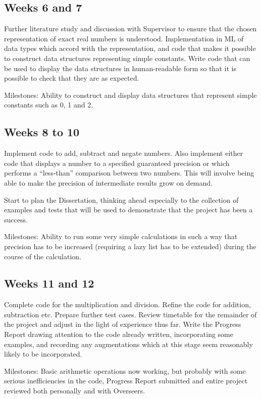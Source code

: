 \documentclass[12pt]{article}
\begin{document}
\subsection*{Weeks 6 and 7}

Further literature study and discussion with Supervisor to ensure that
the chosen representation of exact real numbers is understood.
Implementation in ML of data types which accord with the
representation, and code that makes it possible to construct data
structures representing simple constants.  Write code that can be used
to display the data structures in human-readable form so that it is
possible to check that they are as expected.

Milestones: Ability to construct and display data structures that
represent simple constants such as 0, 1 and 2.


\subsection*{Weeks 8 to 10}

Implement code to add, subtract and negate numbers.  Also implement
either code that displays a number to a specified guaranteed precision
or which performs a ``less-than'' comparison between two numbers.
This will involve being able to make the precision of intermediate
results grow on demand.

Start to plan the Dissertation, thinking ahead especially to the
collection of examples and tests that will be used to demonstrate that
the project has been a success. 

Milestones: Ability to run some very simple calculations in such a way
that precision has to be increased (requiring a lazy list has to be
extended) during the course of the calculation.

\subsection*{Weeks 11 and 12}

Complete code for the multiplication and division.  Refine the code
for addition, subtraction etc.  Prepare further test cases.  Review
timetable for the remainder of the project and adjust in the light of
experience thus far.  Write the Progress Report drawing attention to
the code already written, incorporating some examples, and recording
any augmentations which at this stage seem reasonably likely to be
incorporated.

Milestones: Basic arithmetic operations now working, but probably with
some serious inefficiencies in the code, Progress Report submitted and
entire project reviewed both personally and with Overseers.
\end{document}
